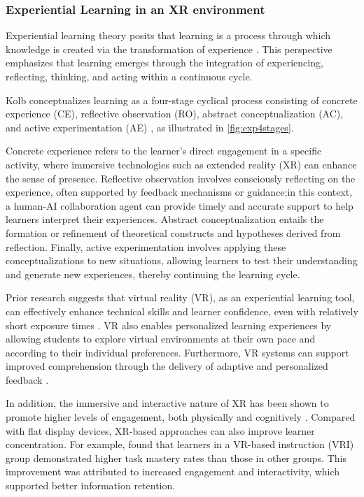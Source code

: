 
\subsubsection{Experiential Learning in an XR environment}

Experiential learning theory posits that learning is a process through which knowledge is created via the transformation of experience \parencite{kolb1984}. This perspective emphasizes that learning emerges through the integration of experiencing, reflecting, thinking, and acting within a continuous cycle.

Kolb conceptualizes learning as a four-stage cyclical process consisting of concrete experience (CE), reflective observation (RO), abstract conceptualization (AC), and active experimentation (AE) \parencite{almeida_learning_2010}, as illustrated in \cref{fig:exp4stages}.

Concrete experience refers to the learner's direct engagement in a specific activity, where immersive technologies such as extended reality (XR) can enhance the sense of presence. Reflective observation involves consciously reflecting on the experience, often supported by feedback mechanisms or guidance;in this context, a human-AI collaboration agent can provide timely and accurate support to help learners interpret their experiences. Abstract conceptualization entails the formation or refinement of theoretical constructs and hypotheses derived from reflection. Finally, active experimentation involves applying these conceptualizations to new situations, allowing learners to test their understanding and generate new experiences, thereby continuing the learning cycle.



Prior research suggests that virtual reality (VR), as an experiential learning tool, can effectively enhance technical skills and learner confidence, even with relatively short exposure times \parencite{knobovitch_virtual_2025}. VR also enables personalized learning experiences by allowing students to explore virtual environments at their own pace and according to their individual preferences. Furthermore, VR systems can support improved comprehension through the delivery of adaptive and personalized feedback \parencite{marougkas_virtual_2023}.

In addition, the immersive and interactive nature of XR has been shown to promote higher levels of engagement, both physically and cognitively \parencite{liu_research_2025}. Compared with flat display devices, XR-based approaches can also improve learner concentration. For example, \textcite{liu_research_2025} found that learners in a VR-based instruction (VRI) group demonstrated higher task mastery rates than those in other groups. This improvement was attributed to increased engagement and interactivity, which supported better information retention.